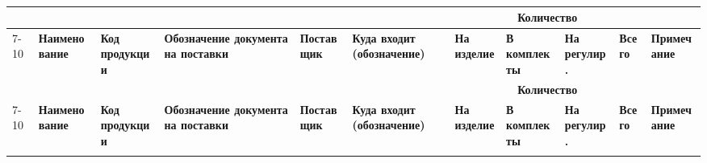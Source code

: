 \documentclass[a3paper,russian,utf8]{eskdgraph}
\begin{document}
\renewcommand{\tablename}{}
\setlength{\extrarowheight}{0,24cm} 

  \newcommand{\ltheadEquipment}{}
  \renewcommand{\ltheadEquipment}
    {
    \hline    
     &&&&&& \multicolumn{4}{c|}{\centering \textbf{Количество}}&\\
    \cline{7-10}
    \multicolumn{1}{|m{1cm}|}{\centering  \textbf{№ стр.}}&
    \multicolumn{1}{m{6cm}|}{\centering   \textbf{Наименование}}&
    \multicolumn{1}{m{3cm}|}{\centering  \textbf{Код продукции}}&
    \multicolumn{1}{m{5cm}|}{\centering   \textbf{Обозначение документа на поставки}}&
    \multicolumn{1}{m{4cm}|}{\centering   \textbf{Поставщик}}& 
    \multicolumn{1}{m{6cm}|}{\centering   \textbf{Куда входит (обозначение)}}& 
    \multicolumn{1}{m{1,6cm}|}{\centering   \textbf{На изделие}}& 
    \multicolumn{1}{m{1,6cm}|}{\centering   \textbf{В комплекты}}&
    \multicolumn{1}{m{1,6cm}|}{\centering   \textbf{На регулир.}}&
    \multicolumn{1}{m{1,6cm}|}{\centering   \textbf{Всего}}&
    \multicolumn{1}{m{2,4cm}|}{\centering   \textbf{Примечание}}\\
    \hline
    }    
\begin{longtable} {|m{1cm}|m{6cm}|m{3cm}|m{5cm}|m{4cm}|m{6cm}|m{}|m{}|m{}|m{}|m{}|}
\caption{}
\label{tab:psitible}
\\
    \ltheadEquipment
    \endfirsthead 
    \ltheadEquipment
    \endhead
    \endfoot
    \endlastfoot

\end{longtable}
\end{document}
